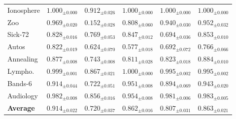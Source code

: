 \begin{table}[t]
\begin{tabular}{lccccc}
Ionosphere    & $\mathbf{1.000}_{\pm0.000}$ & $0.912_{\pm0.026}$ & $\mathbf{1.000}_{\pm0.000}$ & $\mathbf{1.000}_{\pm0.000}$ & $\mathbf{1.000}_{\pm0.000}$ \\
Zoo           & $\mathbf{0.969}_{\pm0.020}$ & $0.152_{\pm0.028}$ & $0.808_{\pm0.060}$ & $0.940_{\pm0.030}$ & $0.952_{\pm0.032}$ \\
Sick-72       & $0.828_{\pm0.016}$ & $0.769_{\pm0.053}$ & $0.847_{\pm0.012}$ & $0.694_{\pm0.036}$ & $\mathbf{0.853}_{\pm0.010}$ \\
Autos         & $\mathbf{0.822}_{\pm0.019}$ & $0.624_{\pm0.070}$ & $0.577_{\pm0.018}$ & $0.692_{\pm0.072}$ & $0.766_{\pm0.066}$ \\
Annealing     & $0.877_{\pm0.008}$ & $0.743_{\pm0.008}$ & $0.811_{\pm0.028}$ & $0.823_{\pm0.018}$ & $\mathbf{0.884}_{\pm0.010}$ \\
Lympho.       & $0.999_{\pm0.001}$ & $0.867_{\pm0.021}$ & $\mathbf{1.000}_{\pm0.000}$ & $0.995_{\pm0.002}$ & $0.995_{\pm0.002}$ \\
Bands-6       & $0.914_{\pm0.044}$ & $0.722_{\pm0.051}$ & $\mathbf{0.951}_{\pm0.008}$ & $0.894_{\pm0.069}$ & $0.943_{\pm0.020}$ \\
Audiology     & $0.982_{\pm0.008}$ & $0.856_{\pm0.016}$ & $0.954_{\pm0.008}$ & $0.981_{\pm0.006}$ & $\mathbf{0.983}_{\pm0.005}$ \\
\midrule
\textbf{Average} & $\mathbf{0.914}_{\pm0.022}$ & $0.720_{\pm0.037}$ & $0.862_{\pm0.016}$ & $0.807_{\pm0.031}$ & $0.863_{\pm0.021}$ \\
\bottomrule
\end{tabular}
\end{table}
